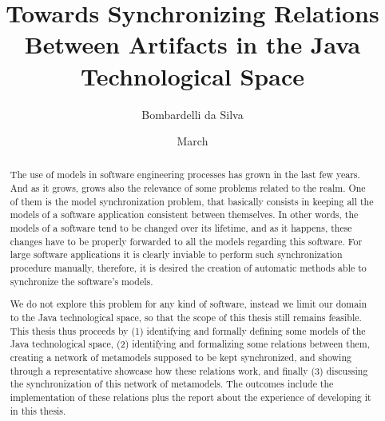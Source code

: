 \documentclass[tuberlin,cic,tc,english,noabntcite, oneside]{iiufrgs}
\title{Towards Synchronizing Relations Between Artifacts in the Java Technological Space}
\author{Bombardelli da Silva}{William}
\date{March}{2016}
\begin{document}
\maketitle





\begin{abstract}
The use of models in software engineering processes has grown in the last few years. And as it grows, grows also the relevance of some problems related to the realm. One of them is the model synchronization problem, that basically consists in keeping all the models of a software application consistent between themselves. In other words, the models of a software tend to be changed over its lifetime, and as it happens, these changes have to be properly forwarded to all the models regarding this software. For large software applications it is clearly inviable to perform such synchronization procedure manually, therefore, it is desired the creation of automatic methods able to synchronize the software's models.

We do not explore this problem for any kind of software, instead we limit our domain to the Java technological space, so that the scope of this thesis still remains feasible. This thesis thus proceeds by (1) identifying and formally defining some models of the Java technological space, (2) identifying and formalizing some relations between them, creating a network of metamodels supposed to be kept synchronized, and showing through a representative showcase how these relations work, and finally (3) discussing the synchronization of this network of metamodels. The outcomes include the implementation of these relations plus the report about the experience of developing it in this thesis.
\end{abstract}
\end{document}
